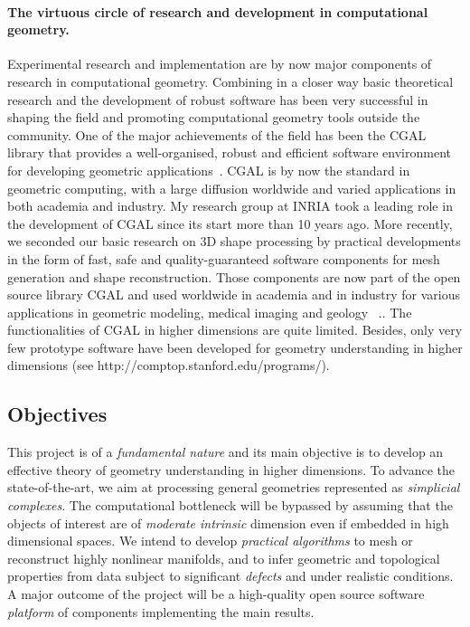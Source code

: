 \paragraph{The  virtuous circle  of research and development in computational geometry.}
Experimental research and implementation are by now major components of research in computational geometry.  
Combining in a closer way basic theoretical research and the development of robust software
has been very successful in shaping the field and promoting computational geometry tools outside the community.
One of the major achievements of the field has been the CGAL library that provides a well-organised, robust and efficient software environment for developing geometric applications~\cite{cgal}. CGAL is by now the standard in geometric computing, with a large diffusion worldwide and varied applications in both academia and industry.  My research group at INRIA took a leading role in the development of CGAL since its start more than 10 years ago. More recently, we seconded our basic research on 3D shape processing by practical developments in the form of fast, safe and quality-guaranteed software components for mesh generation and shape reconstruction.  Those components  are now part of the open source library CGAL  and used worldwide in academia and in industry for various applications in geometric modeling, medical imaging and geology ~\cite{cgal:rty-m3-11}.. The functionalities of CGAL in higher dimensions are quite limited. Besides, only very few prototype software have been developed for geometry understanding in higher dimensions (see http://comptop.stanford.edu/programs/).

\subsection{Objectives} 
This project is of a {\em fundamental nature} and its main objective is to develop an effective theory of geometry understanding in higher dimensions. To advance the state-of-the-art, we aim at processing general geometries represented as {\em simplicial complexes}. The computational bottleneck will be bypassed by assuming that the objects of interest are of {\em moderate intrinsic} dimension even if embedded in high dimensional spaces. We intend to develop {\em practical algorithms} to mesh or reconstruct highly nonlinear manifolds, and to infer geometric and topological properties from data subject to significant {\em defects} and
 under realistic conditions. A major outcome of the project will be a high-quality open source software {\em platform} of components implementing the main results.

